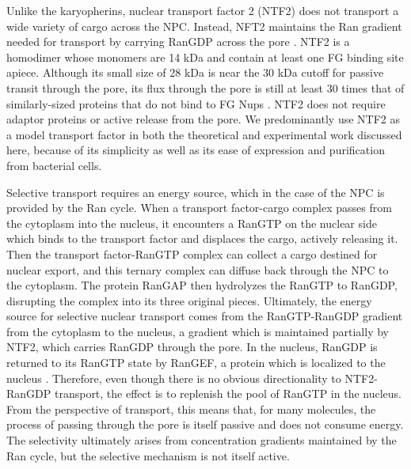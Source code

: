 Unlike the karyopherins, nuclear transport factor 2 (NTF2) does not transport a wide variety of cargo across the NPC.  Instead, NFT2 maintains the Ran gradient needed for transport by carrying RanGDP across the pore \cite{ribbeck98,bayliss99}.  NTF2 is a homodimer whose monomers are 14 kDa and contain at least one FG binding site apiece.  Although its small size of 28 kDa is near the 30 kDa cutoff for passive transit through the pore, its flux through the pore is still at least 30 times that of similarly-sized proteins that do not bind to FG Nups \cite{ribbeck01,siebrasse02,kiskin03}.  NTF2 does not require adaptor proteins or active release from the pore. We predominantly use NTF2 as a model transport factor in both the theoretical and experimental work discussed here, because of its simplicity as well as its ease of expression and purification from bacterial cells.

Selective transport requires an energy source, which in the case of the NPC is provided by the Ran cycle.  When a transport factor-cargo complex passes from the cytoplasm into the nucleus, it encounters a RanGTP on the nuclear side which binds to the transport factor and displaces the cargo, actively releasing it.  Then the transport factor-RanGTP complex can collect a cargo destined for nuclear export, and this ternary complex can diffuse back through the NPC to the cytoplasm.  The protein RanGAP then hydrolyzes the RanGTP to RanGDP, disrupting the complex into its three original pieces.  Ultimately, the energy source for selective nuclear transport comes from the RanGTP-RanGDP gradient from the cytoplasm to the nucleus, a gradient which is maintained partially by NTF2, which carries RanGDP through the pore.  In the nucleus, RanGDP is returned to its RanGTP state by RanGEF, a protein which is localized to the nucleus \cite{ribbeck98,jovanovic-talisman17,stanley17}. Therefore, even though there is no obvious directionality to NTF2-RanGDP transport, the effect is to replenish the pool of RanGTP in the nucleus. From the perspective of transport, this means that, for many molecules, the process of passing through the pore is itself passive and does not consume energy.  The selectivity ultimately arises from concentration gradients maintained by the Ran cycle, but the selective mechanism is not itself active.

